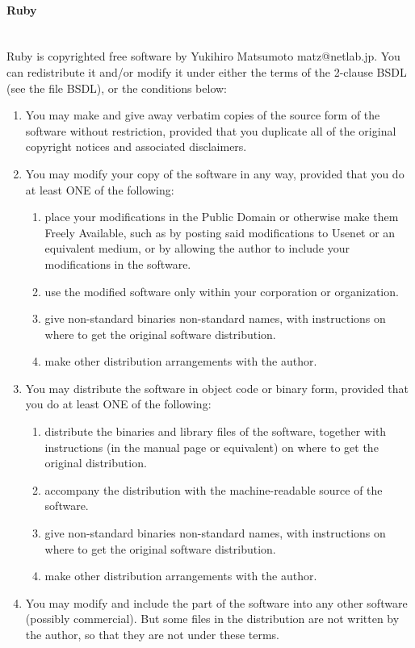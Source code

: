 \documentclass[11pt,a4paper, twoside]{article}
\begin{document}
\paragraph{Ruby} ~\\
\newline
Ruby is copyrighted free software by Yukihiro Matsumoto matz@netlab.jp.
You can redistribute it and/or modify it under either the terms of the
2-clause BSDL (see the file BSDL), or the conditions below:
\begin{enumerate}
\item  You may make and give away verbatim copies of the source form of the
     software without restriction, provided that you duplicate all of the
     original copyright notices and associated disclaimers.
\item You may modify your copy of the software in any way, provided that
     you do at least ONE of the following:
     \begin{enumerate}
     	\item  place your modifications in the Public Domain or otherwise
          make them Freely Available, such as by posting said
	  modifications to Usenet or an equivalent medium, or by allowing
	  the author to include your modifications in the software.
	  	\item use the modified software only within your corporation or
          organization.
        \item give non-standard binaries non-standard names, with
          instructions on where to get the original software distribution.
        \item make other distribution arrangements with the author.
     \end{enumerate}
\item You may distribute the software in object code or binary form,
     provided that you do at least ONE of the following:
     \begin{enumerate}
     	\item distribute the binaries and library files of the software,
	  together with instructions (in the manual page or equivalent)
	  on where to get the original distribution.
	  	\item accompany the distribution with the machine-readable source of
	  the software.
	  	\item give non-standard binaries non-standard names, with
          instructions on where to get the original software distribution.
        \item make other distribution arrangements with the author.
     \end{enumerate}
\item You may modify and include the part of the software into any other
     software (possibly commercial).  But some files in the distribution
     are not written by the author, so that they are not under these terms.


\end{enumerate}
\end{document}
